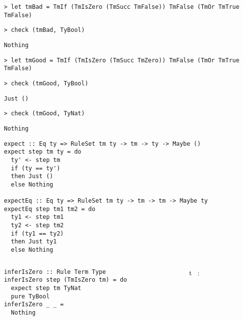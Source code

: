 \begin{frame}[fragile]
  \onslide<+->
  \begin{verbatim}
> let tmBad = TmIf (TmIsZero (TmSucc TmFalse)) TmFalse (TmOr TmTrue TmFalse)
  \end{verbatim}
  \onslide<+->
  \begin{verbatim}
> check (tmBad, TyBool)
  \end{verbatim}
  \onslide<+->
  \begin{verbatim}
Nothing
  \end{verbatim}
  \onslide<+->
  \begin{verbatim}
> let tmGood = TmIf (TmIsZero (TmSucc TmZero)) TmFalse (TmOr TmTrue TmFalse)
  \end{verbatim}
  \onslide<+->
  \begin{verbatim}
> check (tmGood, TyBool)
  \end{verbatim}
  \onslide<+->
  \begin{verbatim}
Just ()
  \end{verbatim}
  \onslide<+->
  \begin{verbatim}
> check (tmGood, TyNat)
  \end{verbatim}
  \onslide<+->
  \begin{verbatim}
Nothing
  \end{verbatim}
\end{frame}

\begin{frame}[fragile]
  \begin{verbatim}
expect :: Eq ty => RuleSet tm ty -> tm -> ty -> Maybe ()
expect step tm ty = do
  ty' <- step tm
  if (ty == ty')
  then Just ()
  else Nothing

expectEq :: Eq ty => RuleSet tm ty -> tm -> tm -> Maybe ty
expectEq step tm1 tm2 = do
  ty1 <- step tm1
  ty2 <- step tm2
  if (ty1 == ty2)
  then Just ty1
  else Nothing
  \end{verbatim}
\end{frame}

\begin{frame}[fragile]
  \begin{columns}
    \begin{column}{0.5\textwidth}
      \begin{verbatim}
inferIsZero :: Rule Term Type
inferIsZero step (TmIsZero tm) = do
  expect step tm TyNat
  pure TyBool
inferIsZero _ _ =
  Nothing
      \end{verbatim}
    \end{column}
    \begin{column}{0.5\textwidth}
          {\vdash {}~t ~{:}~ }
    \end{column}
  \end{columns}
\end{frame}

